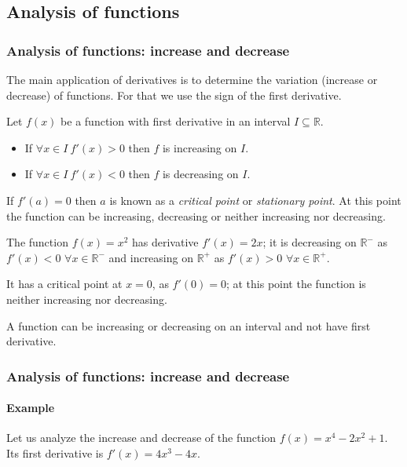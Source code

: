 \subsection{Analysis of functions}
\begin{frame}
\frametitle{Analysis of functions: increase and decrease}
The main application of derivatives is to determine the variation (increase or decrease) of functions. 
For that we use the sign of the first derivative.  
\begin{theorem}
Let $f(x)$ be a function with first derivative in an interval $I\subseteq \mathbb{R}$.
\begin{itemize}
\item If $\forall x\in I\ f'(x)> 0$ then $f$ is increasing on $I$.
\item If $\forall x\in I\ f'(x)< 0$ then $f$ is decreasing on $I$.
\end{itemize}
\end{theorem}
If $f'(a)=0$ then $a$ is known as a \emph{critical point} or \emph{stationary point}.
At this point the function can be increasing, decreasing or neither increasing nor decreasing. 

The function $f(x)=x^2$ has derivative $f'(x)=2x$; it is decreasing on $\mathbb{R}^-$ as $f'(x)< 0$ $\forall x\in \mathbb{R}^-$  and increasing on $\mathbb{R}^+$ as $f'(x)> 0$ $\forall x\in \mathbb{R}^+$.

It has a critical point at $x=0$, as $f'(0)=0$; at this point the function is neither increasing nor decreasing.

 {A function can be increasing or decreasing on an interval and not have first derivative.}
\end{frame}


\begin{frame}
\frametitle{Analysis of functions: increase and decrease}
\framesubtitle{Example}
Let us analyze the increase and decrease of the function $f(x)=x^4-2x^2+1$. 
Its first derivative is $f'(x)=4x^3-4x$.
\begin{center}
\scalebox{0.9}{}
\end{center}
\end{frame}



